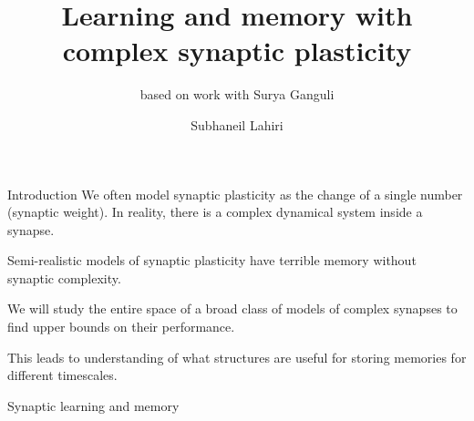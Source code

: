 \documentclass{beamer}%
\title[Complex synapses]{Learning and memory with complex synaptic plasticity}
\subtitle{\small{based on work with Surya Ganguli}
}
\author{Subhaneil Lahiri%
}
\institute[Stanford]{%
Stanford University, Applied Physics
}
\begin{document}

\begin{frame}
%
 \titlepage
%
\end{frame}


\begin{frame}{Introduction}
%
 We often model synaptic plasticity as the change of a single number (synaptic weight).
 In reality, there is a complex dynamical system inside a synapse.

 \vp Semi-realistic models of synaptic plasticity have terrible memory without synaptic complexity.

 \vp We will study the entire space of a broad class of models of complex synapses to find upper bounds on their performance.

 \vp This leads to understanding of what structures are useful for storing memories for different timescales.
%
\end{frame}


\begin{frame}{Synaptic learning and memory}
%
%
%
 \begin{center}
 \end{center}

%
\end{frame}

\end{document}
